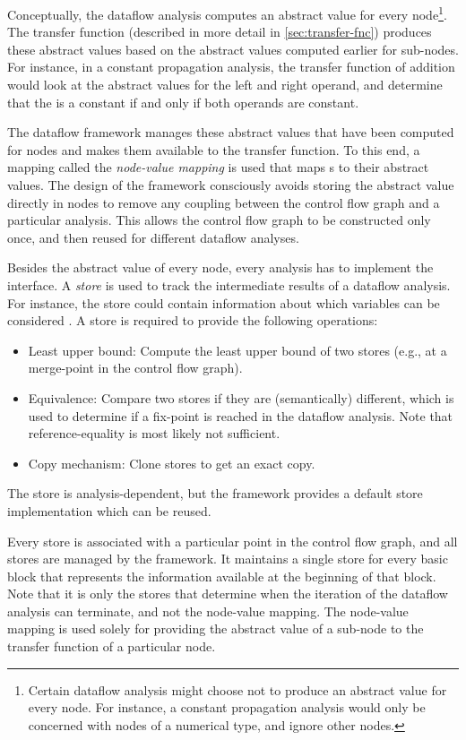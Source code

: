 \begin{new}
Conceptually, the dataflow analysis computes an abstract value for every node\footnote{Certain
dataflow analysis might choose not to produce an abstract value for every node.  For instance,
a constant propagation analysis would only be concerned with nodes of a numerical type, and
ignore other nodes.}.
The transfer function (described in more detail in \autoref{sec:transfer-fnc}) produces these abstract
values based on the abstract values computed earlier for sub-nodes.
For instance, in a constant propagation analysis, the transfer function of addition would look at
the abstract values for the left and right operand, and determine that the 
is a constant if and only if both operands are constant.

The dataflow framework manages these abstract values that have been computed for nodes and
makes them available to the transfer function.  To this end, a mapping called the
\emph{node-value mapping} is used that maps s to their abstract values.
The design of the framework consciously avoids storing the abstract value directly in
nodes to remove any coupling between the control flow graph and a particular analysis.
This allows the control flow graph to be constructed only once, and then reused for different
dataflow analyses.

\end{new}
Besides the abstract value of every node,
every analysis has to implement the  interface. A \emph{store} is
used to track the intermediate results of a dataflow analysis. For instance, the store
could contain information about which variables can be considered .
A store is required to provide the following operations:
\begin{itemize}
\item Least upper bound: Compute the least upper bound of two stores (e.g., at a merge-point
in the control flow graph).
\item Equivalence: Compare two stores if they are (semantically) different, which is used
to determine if a fix-point is reached in the dataflow analysis. Note that reference-equality
is most likely not sufficient.
\item Copy mechanism: Clone stores to get an exact copy.
\end{itemize}
The store is analysis-dependent, but the framework provides a default store implementation
which can be reused.

\begin{new}
Every store is associated with a particular point in the control flow graph, and
all stores are managed by the framework. It maintains
a single store for every basic block that represents the information available at the
beginning of that block.
Note that it is only the stores that determine when the iteration of the dataflow analysis
can terminate, and not the node-value mapping.  The node-value mapping is used solely for
providing the abstract value of a sub-node to the transfer function of a particular node.
\end{new}


